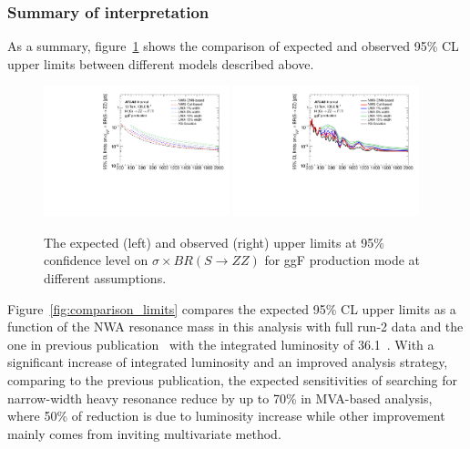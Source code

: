 \subsubsection{Summary of interpretation}

As a summary, figure~\ref{fig:models_limits} shows the comparison of expected and observed 95\% CL upper limits between different models described above.

\begin{figure}[h]
    \centering
    \includegraphics[width=0.48\textwidth]{figures/HMHZZ/results/4l_compareAll_exp.pdf}
    \includegraphics[width=0.48\textwidth]{figures/HMHZZ/results/4l_compareAll_obs.pdf}
    \caption{The expected (left) and observed (right) upper limits at 95\% confidence level on $\sigma \times BR(S\to ZZ)$ for ggF production mode at different assumptions. }
    \label{fig:models_limits}
\end{figure}

Figure~\ref{fig:comparison_limits} compares the expected 95\% CL upper limits as a function of the NWA resonance mass 
in this analysis with full run-2 data and the one in previous publication~\cite{Aaboud:2017rel} with the integrated luminosity of 36.1~\ifb.
With a significant increase of integrated luminosity and an improved analysis strategy, comparing to the previous publication,
the expected sensitivities of searching for narrow-width heavy resonance reduce by up to 70\% in MVA-based analysis,
where 50\% of reduction is due to luminosity increase while other improvement mainly comes from inviting multivariate method.

